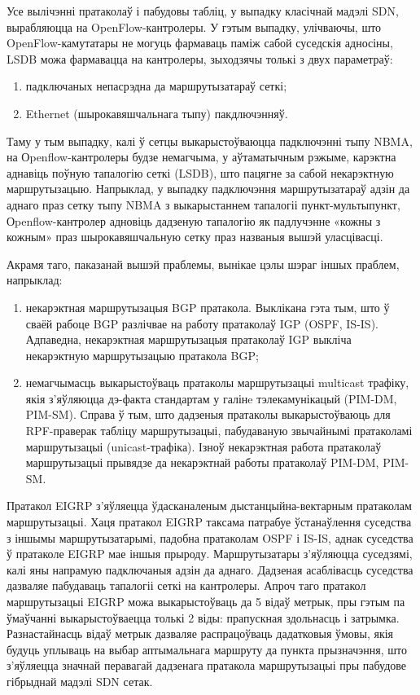 Усе вылічэнні пратаколаў і пабудовы табліц, у выпадку класічнай мадэлі SDN, вырабляюцца на OpenFlow-кантролеры. У гэтым выпадку, улічваючы, што OpenFlow-камутатары не могуць фармаваць паміж сабой суседскія адносіны, LSDB можа фармавацца на кантролеры, зыходзячы толькі з двух параметраў:
\begin{enumerate}
    \item падключаных непасрэдна да маршрутызатараў сеткі;
    \item Ethernet (шырокавяшчальнага тыпу) пакдлючэнняў.
\end{enumerate}

Таму у тым выпадку, калі ў сетцы выкарыстоўваюцца падключэнні тыпу NBMA, на Оpenflow-кантролеры будзе немагчыма, у аўтаматычным рэжыме,
карэктна аднавіць поўную тапалогію сеткі (LSDB), што пацягне за сабой некарэктную маршрутызацыю.
Напрыклад, у выпадку падключэння маршрутызатараў адзін да аднаго праз сетку тыпу NBMA з выкарыстаннем тапалогіі пункт-мультыпункт, Оpenflow-кантролер адновіць дадзеную тапалогію як падлучэнне «кожны з кожным» праз шырокавяшчальную сетку праз названыя вышэй уласцівасці.

Акрамя таго, паказанай вышэй праблемы, вынікае цэлы шэраг іншых праблем, напрыклад:
\begin{enumerate}
    \item некарэктная маршрутызацыя BGP пратакола. Выклікана гэта тым, што ў сваёй рабоце BGP разлічвае на работу пратаколаў IGP (OSPF, IS-IS). Адпаведна, некарэктная маршрутызацыя пратаколаў IGP выкліча некарэктную маршрутызацыю пратакола BGP;
    \item немагчымасць выкарыстоўваць пратаколы маршрутызацыі multicast трафіку, якія з'яўляюцца дэ-факта стандартам у галінe тэлекамунікацый (PIM-DM, PIM-SM). Справа ў тым, што дадзеныя пратаколы выкарыстоўваюць для RPF-праверак табліцу маршрутызацыі, пабудаваную звычайнымі пратаколамі
    маршрутызацыі (unicast-трафіка). Ізноў некарэктная работа пратаколаў
    маршрутызацыі прывядзе да некарэктнай работы пратаколаў PIM-DM, PIM-SM.
\end{enumerate}

Пратакол EIGRP з'яўляецца ўдасканаленым дыстанцыйна-вектарным
пратаколам маршрутызацыі. Хаця пратакол EIGRP таксама патрабуе ўстанаўлення
суседства з іншымы маршрутызатарымі, падобна пратаколам OSPF і IS-IS, аднак
суседства ў пратаколе EIGRP мае іншыя прыроду. Маршрутызатары з'яўляюцца суседзямі, калі яны напрамую падключаныя адзін да аднаго. Дадзеная асаблівасць суседства дазваляе пабудаваць тапалогіі сеткі на кантролеры.
Апроч таго пратакол маршрутызацыі EIGRP можа выкарыстоўваць да 5 відаў метрык, пры гэтым па ўмаўчанні выкарыстоўваецца толькі 2 віды:
прапускная здольнасць і затрымка.
Разнастайнасць відаў метрык дазваляе распрацоўваць дадатковыя ўмовы,
якія будуць уплываць на выбар аптымальнага маршруту да пункта прызначэння,
што з'яўляецца значнай перавагай дадзенага пратакола маршрутызацыі пры
пабудове гібрыднай мадэлі SDN сетак.

